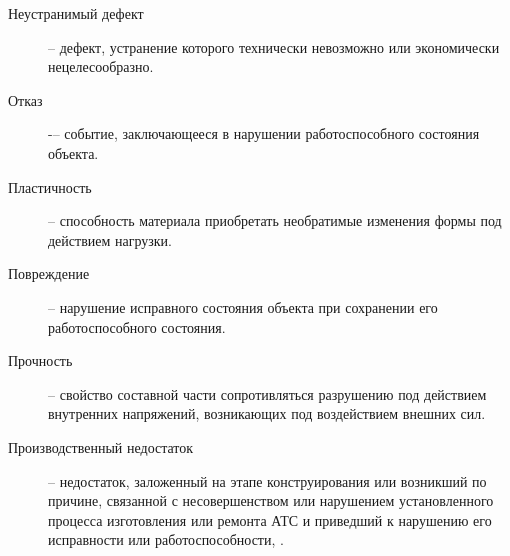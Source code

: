 \begin{description}
	\item
	[Неустранимый дефект] -- дефект, устранение которого технически невозможно или экономически нецелесообразно.
	\item
	[Отказ]  -–  событие, заключающееся в нарушении работоспособного состояния объекта.
	\item
	[Пластичность] --  способность  материала
	приобретать  необратимые  изменения  формы  под действием нагрузки.
	\item  
	[Повреждение] -- нарушение исправного состояния объекта при сохранении его работоспособного состояния.
\item
[Прочность] -- свойство составной части сопротивляться разрушению под
действием внутренних напряжений, возникающих под воздействием внешних сил. 
\item
[Производственный недостаток]  -- недостаток, заложенный на этапе конструирования или возникший по причине, связанной с несовер­шенством или нарушением установленного процесса изготовления или ремонта АТС и приведший к нарушению его исправности или ра­ботоспособности, \cite{remont:2007}.

\end{description}
